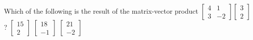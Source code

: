 \begin{activity}
Which of the following is the result of the matrix-vector product
\(\begin{bmatrix} 4&1\\3&-2 \end{bmatrix}\begin{bmatrix} 3\\2 \end{bmatrix}\)?
{\(\begin{bmatrix} 15\\2 \end{bmatrix}\)}
{\(\begin{bmatrix} 18\\-1 \end{bmatrix}\)}
{\(\begin{bmatrix} 21\\-2 \end{bmatrix}\)}
\end{activity}




